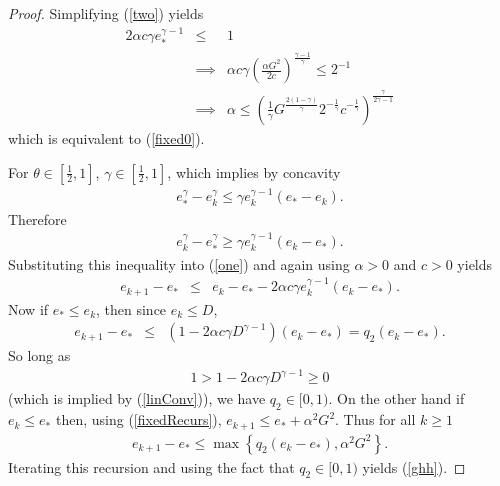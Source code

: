 \begin{proof}
Simplifying (\ref{two}) yields
 \begin{eqnarray*}
 2\alpha c \gamma e_*^{\gamma-1}
 &\leq& 1
 \\
 &\implies&
\alpha c \gamma  \left(\frac{\alpha G^2}{2c}\right)^{\frac{\gamma-1}{\gamma}}
 \leq 2^{-1}
 \\
 &\implies&
 \alpha
 \leq 
 \left(
 \frac{1}{\gamma}G^{\frac{2(1-\gamma)}{\gamma}}2^{-\frac{1}{\gamma}}
 c^{-\frac{1}{\gamma}}
 \right)^{\frac{\gamma}{2\gamma-1}}
 \end{eqnarray*}
 which  is equivalent to  (\ref{fixed0}).
 
 
 \noindent
 For $\theta\in[\frac{1}{2},1]$, $\gamma\in[\frac{1}{2},1]$, which implies by concavity
 \begin{eqnarray*}
 e_*^\gamma- e_k^\gamma
 \leq 
 \gamma e_k^{\gamma-1}(e_*-e_k).
 \end{eqnarray*}
 Therefore
 \begin{eqnarray*}
 e_k^\gamma-e_*^{\gamma}
 \geq
 \gamma  e_k^{\gamma-1}
 (e_k-e_*).
 \end{eqnarray*}
 Substituting this inequality into (\ref{one}) and again using $\alpha>0$ and $c>0$ yields
 \begin{eqnarray*}
 e_{k+1}-e_*&\leq& 
 e_k - e_* - 2\alpha c\gamma e_k^{\gamma-1} (e_k - e_*).
 \end{eqnarray*}
  Now if $e_*\leq e_k$, then since $e_k\leq D$,
 \begin{eqnarray*}\label{pas}
 e_{k+1}-e_*&\leq& 
 (1 - 2\alpha c\gamma D^{\gamma-1}) (e_k - e_*) = q_2(e_k - e_*).
 \end{eqnarray*}
 So long as 
 \begin{eqnarray*}
 1>1-2\alpha c\gamma  D^{\gamma-1}\geq 0
 \end{eqnarray*}
(which is implied by (\ref{linConv})), we have $q_2\in [0,1)$. On the other hand if $e_k\leq e_*$ then, using (\ref{fixedRecurs}), $e_{k+1}\leq e_*+ \alpha^2 G^2$. Thus for all $k\geq 1$
\begin{eqnarray*}
e_{k+1}-e_*\leq 
\max\left\{
q_2(e_k-e_*),\alpha^2 G^2
\right\}
.
\end{eqnarray*}
 Iterating this recursion and using the fact that $q_2\in[0,1)$ yields (\ref{ghh}).
 
\end{proof}